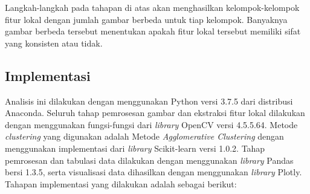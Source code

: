 Langkah-langkah pada tahapan di atas akan menghasilkan kelompok-kelompok fitur lokal dengan jumlah gambar berbeda untuk tiap kelompok. Banyaknya gambar berbeda tersebut menentukan apakah fitur lokal tersebut memiliki sifat yang konsisten atau tidak. 

\subsection{Implementasi}
Analisis ini dilakukan dengan menggunakan Python versi 3.7.5 dari distribusi Anaconda. Seluruh tahap pemrosesan gambar dan ekstraksi fitur lokal dilakukan dengan menggunakan fungsi-fungsi dari \textit{library} OpenCV versi 4.5.5.64. Metode \textit{clustering} yang digunakan adalah Metode \textit{Agglomerative Clustering} dengan menggunakan implementasi dari \textit{library} Scikit-learn versi 1.0.2. Tahap pemrosesan dan tabulasi data dilakukan dengan menggunakan \textit{library} Pandas bersi 1.3.5, serta visualisasi data dihasilkan dengan menggunakan \textit{library} Plotly. Tahapan implementasi yang dilakukan adalah sebagai berikut:
